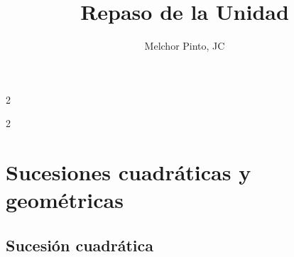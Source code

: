 \documentclass[12pt,addpoints]{repaso}
\title{Repaso de la Unidad}
\author{Melchor Pinto, JC}
\begin{document}
\begin{multicols}{2}
	\tableofcontents
\end{multicols}
\vfill\newpage
\begin{multicols}{2}
    
    
\end{multicols}
\section{Sucesiones cuadráticas y geométricas}
\subsection{Sucesión cuadrática}
\end{document}

